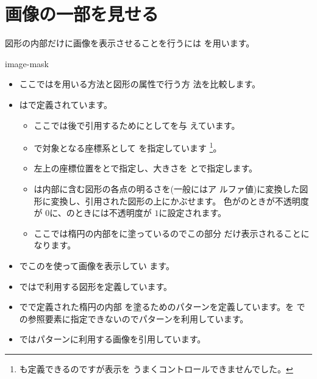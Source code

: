 \section{画像の一部を見せる}
図形の内部だけに画像を表示させることを行うには
を用います。

{image-mask}
{}
\begin{itemize}
 \item ここではを用いる方法と図形の属性で行う方
       法を比較します。
 \item {}はで定義されています。
\begin{itemize}
 \item ここでは後で引用するためにとしてを与
       えています。
 \item {}で対象となる座標系として
       を指定しています
       \footnote{も定義できるのですが表示を
       うまくコントロールできませんでした。}。
 \item 左上の座標位置をとで指定し、大きさを
       とで指定します。
 \item {}は内部に含む図形の各点の明るさを(一般にはア
       ルファ値)に変換した図形に変換し、引用された図形の上にかぶせます。
       色がのときが不透明度が
       $0$に、のときには不透明度が
       $1$に設定されます。
 \item ここでは楕円の内部をに塗っているのでこの部分
       だけ表示されることになります。
\end{itemize}
 \item {}でこのを使って画像を表示してい
       ます。
 \item {}ではで利用する図形を定義しています。
 \item {}でで定義された楕円の内部
       を塗るためのパターンを定義しています。を
       での参照要素に指定できないのでパターンを利用しています。
 \item {}ではパターンに利用する画像を引用しています。
\end{itemize}
